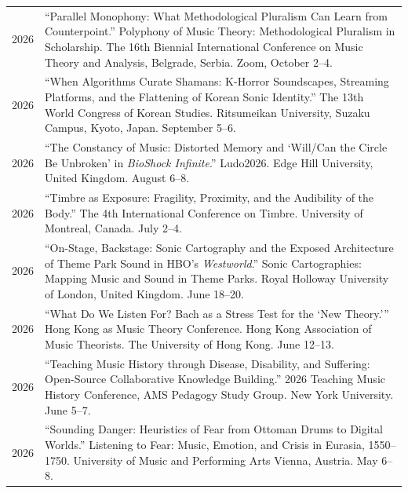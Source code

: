 \documentclass[a4paper,11pt,draft]{article}
\begin{document}
  \hspace*{-0.25cm}
  \begin{tabular}{p{2.5cm} p{12.5cm}}
  	2026 & ``Parallel Monophony: What Methodological Pluralism Can Learn from Counterpoint.'' Polyphony of Music Theory: Methodological Pluralism in Scholarship. The 16th Biennial International Conference on Music Theory and Analysis, Belgrade, Serbia. Zoom, October 2--4.\\[2mm]
  	
  	2026 & ``When Algorithms Curate Shamans: K-Horror Soundscapes, Streaming Platforms, and the Flattening of Korean Sonic Identity.'' The 13th World Congress of Korean Studies. Ritsumeikan University, Suzaku Campus, Kyoto, Japan. September 5--6.\\[2mm]
  	
  	2026 & ``The Constancy of Music: Distorted Memory and `Will/Can the Circle Be Unbroken' in \textit{BioShock Infinite}.'' Ludo2026. Edge Hill University, United Kingdom. August 6--8.\\[2mm]
  	
  	2026 & ``Timbre as Exposure: Fragility, Proximity, and the Audibility of the Body.'' The 4th International Conference on Timbre. University of Montreal, Canada. July 2--4.\\[2mm]
  	
  	2026 & ``On-Stage, Backstage: Sonic Cartography and the Exposed Architecture of Theme Park Sound in HBO's \textit{Westworld}.'' Sonic Cartographies: Mapping Music and Sound in Theme Parks. Royal Holloway University of London, United Kingdom. June 18--20.\\[2mm]
  	
  	2026 & ``What Do We Listen For? Bach as a Stress Test for the `New Theory.''' Hong Kong as Music Theory Conference. Hong Kong Association of Music Theorists. The University of Hong Kong. June 12--13.\\[2mm]

  	2026 & ``Teaching Music History through Disease, Disability, and Suffering: Open-Source Collaborative Knowledge Building.'' 2026 Teaching Music History Conference, AMS Pedagogy Study Group. New York University. June 5--7.\\[2mm]
  	
  	2026 & ``Sounding Danger: Heuristics of Fear from Ottoman Drums to Digital Worlds.'' Listening to Fear: Music, Emotion, and Crisis in Eurasia, 1550–1750. University of Music and Performing Arts Vienna, Austria. May 6--8.\\[2mm]
    

\end{tabular}
\end{document}
